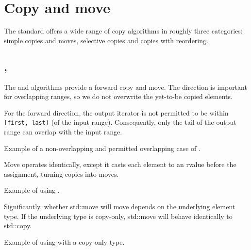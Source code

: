 \section{Copy and move}

The standard offers a wide range of copy algorithms in roughly three categories: simple copies and moves, selective copies and copies with reordering.

\subsection{\texorpdfstring{, }{\texttt{std::copy}, \texttt{std::move}}}

The  and  algorithms provide a forward copy and move. The direction is important for overlapping ranges, so we do not overwrite the yet-to-be copied elements.

For the forward direction, the output iterator is not permitted to be within \texttt{[first, last)} (of the input range). Consequently, only the tail of the output range can overlap with the input range.



\begin{box-note}
\footnotesize Example of a non-overlapping and permitted overlapping case of .
\tcblower
{}
\end{box-note}

Move operates identically, except it casts each element to an rvalue before the assignment, turning copies into moves.

\begin{box-note}
\footnotesize Example of using .
\tcblower
{}
\end{box-note}

Significantly, whether std::move will move depends on the underlying element type. If the underlying type is copy-only, std::move will behave identically to std::copy.

\begin{box-note}
\footnotesize Example of using  with a copy-only type.
\tcblower
{}
\end{box-note}

